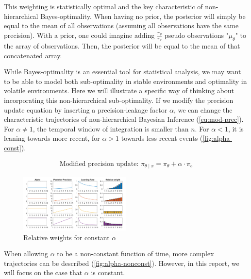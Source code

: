 \documentclass{article}
\begin{document}
\begin{multicols}{2}
This weighting is statistically optimal and the key characteristic of non-hierarchical Bayes-optimality. When having no prior, the posterior will simply be equal to the mean of all observations (assuming all observations have the same precision). With a prior, one could imagine adding $\frac{\pi_\theta}{\pi_e}$ pseudo observations "$\mu_\theta$" to the array of observations. Then, the posterior will be equal to the mean of that concatenated array. 

While Bayes-optimality is an essential tool for statistical analysis, we may want to be able to model both sub-optimality in stable environments and optimality in volatile environments. Here we will illustrate a specific way of thinking about incorporating this non-hierarchical sub-optimality. If we modify the precision update equation by inserting a precision-leakage factor $\alpha$, we can change the characteristic trajectories of non-hierarchical Bayesian Inference (\ref{eq:mod-prec}). For $\alpha \neq 1$, the temporal window of integration is smaller than $n$. For $\alpha < 1$, it is leaning towards more recent, for $\alpha >1$ towards less recent events (\autoref{fig:alpha-const}). 


\begin{align} \label{eq:mod-prec}
\text{Modified precision update: } \pi_{\theta \mid x} = \pi_\theta + \alpha \cdot \pi_e 
\end{align}

\vfill\null
\columnbreak

\begin{figure}[H]
\centering
\includegraphics[width=0.5\textwidth]{alpha_constant_new.PNG}
\caption{Relative weights for constant $\alpha$}
  \label{fig:alpha-const}
\end{figure}
\vspace{-0.5cm}


When allowing $\alpha$ to be a non-constant function of time, more complex trajectories can be described (\autoref{fig:alpha-nonconst}). However, in this report, we will focus on the case that $\alpha$ is constant.


\end{multicols}
\end{document}
